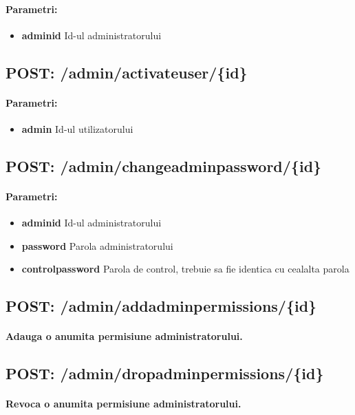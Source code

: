 \paragraph{Parametri:}
\begin{itemize}
\item \textbf{adminid}
 Id-ul administratorului
 \end{itemize}
 \subsection*{POST: /admin/activateuser/\{id\}}

\paragraph{Parametri:}
\begin{itemize}
\item \textbf{admin}
 Id-ul utilizatorului
 \end{itemize}
 \subsection*{POST: /admin/changeadminpassword/\{id\}}

\paragraph{Parametri:}
\begin{itemize}
\item \textbf{adminid}
 Id-ul administratorului
\item \textbf{password}
 Parola administratorului
\item \textbf{controlpassword}
 Parola de control, trebuie sa fie identica cu cealalta parola
 \end{itemize}
 \subsection*{POST: /admin/addadminpermissions/\{id\}}

\paragraph{Adauga o anumita permisiune administratorului. }
 \subsection*{POST: /admin/dropadminpermissions/\{id\}}

\paragraph{Revoca o anumita permisiune administratorului. }
